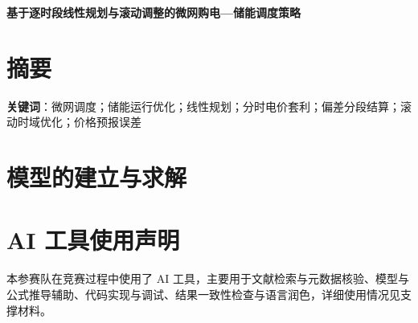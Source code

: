 \documentclass[10pt,a4paper]{ctexart}
\numberwithin{equation}{section}
\begin{document}
\begin{center}
  {\bfseries 基于逐时段线性规划与滚动调整的\linebreak 微网购电—储能调度策略}
\end{center}
\vspace{2pt}

\section*{摘\quad 要}
\makeatletter\@afterindenttrue\makeatother


\vspace{4pt}
\noindent\textbf{关键词}：微网调度；储能运行优化；线性规划；分时电价套利；偏差分段结算；滚动时域优化；价格预报误差

\newpage






\section{模型的建立与求解}










\section*{AI 工具使用声明}
本参赛队在竞赛过程中使用了 AI 工具，主要用于文献检索与元数据核验、模型与公式推导辅助、代码实现与调试、结果一致性检查与语言润色，详细使用情况见支撑材料。




\end{document}
